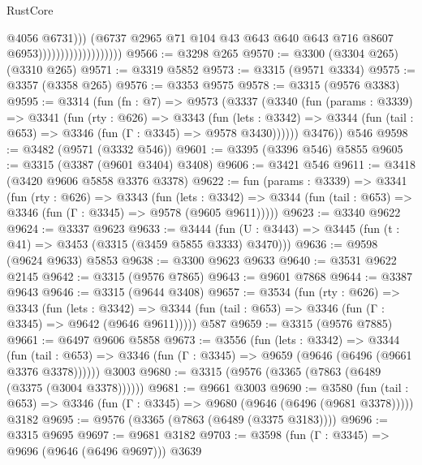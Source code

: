 \begin{lexlean}{RustCore}
\begin{coremodule}
                                              @4056
                                              @6731)))
                                        (@6737
                                          @2965
                                          @71
                                          @104
                                          @43
                                          @643
                                          @640
                                          @643
                                          @716
                                          @8607
                                          @6953)))))))))))))))))))
@9566 := @3298 @265
@9570 := @3300 (@3304 @265) (@3310 @265)
@9571 := @3319 @5852
@9573 := @3315 (@9571 @3334)
@9575 := @3357 (@3358 @265)
@9576 := @3353 @9575
@9578 := @3315 (@9576 @3383)
@9595 := @3314
    (fun (fn : @7) =>
    @9573
      (@3337
        (@3340
          (fun (params : @3339) =>
          @3341
            (fun (rty : @626) =>
            @3343
              (fun (lets : @3342) =>
              @3344 (fun (tail : @653) => @3346 (fun (Γ : @3345) => @9578 @3430))))))
        @3476))
    @546
@9598 := @3482 (@9571 (@3332 @546))
@9601 := @3395 (@3396 @546) @5855
@9605 := @3315 (@3387 (@9601 @3404) @3408)
@9606 := @3421 @546
@9611 := @3418 (@3420 @9606 @5858 @3376 @3378)
@9622 := fun (params : @3339) =>
  @3341
    (fun (rty : @626) =>
    @3343
      (fun (lets : @3342) =>
      @3344 (fun (tail : @653) => @3346 (fun (Γ : @3345) => @9578 (@9605 @9611)))))
@9623 := @3340 @9622
@9624 := @3337 @9623
@9633 := @3444 (fun (U : @3443) => @3445 (fun (t : @41) => @3453 (@3315 (@3459 @5855 @3333) @3470)))
@9636 := @9598 (@9624 @9633) @5853
@9638 := @3300 @9623 @9633
@9640 := @3531 @9622 @2145
@9642 := @3315 (@9576 @7865)
@9643 := @9601 @7868
@9644 := @3387 @9643
@9646 := @3315 (@9644 @3408)
@9657 := @3534
    (fun (rty : @626) =>
    @3343
      (fun (lets : @3342) =>
      @3344 (fun (tail : @653) => @3346 (fun (Γ : @3345) => @9642 (@9646 @9611)))))
    @587
@9659 := @3315 (@9576 @7885)
@9661 := @6497 @9606 @5858
@9673 := @3556
    (fun (lets : @3342) =>
    @3344
      (fun (tail : @653) => @3346 (fun (Γ : @3345) => @9659 (@9646 (@6496 (@9661 @3376 @3378))))))
    @3003
@9680 := @3315 (@9576 (@3365 (@7863 (@6489 (@3375 (@3004 @3378))))))
@9681 := @9661 @3003
@9690 := @3580
    (fun (tail : @653) => @3346 (fun (Γ : @3345) => @9680 (@9646 (@6496 (@9681 @3378)))))
    @3182
@9695 := @9576 (@3365 (@7863 (@6489 (@3375 @3183))))
@9696 := @3315 @9695
@9697 := @9681 @3182
@9703 := @3598 (fun (Γ : @3345) => @9696 (@9646 (@6496 @9697))) @3639

\end{coremodule}
\end{lexlean}
